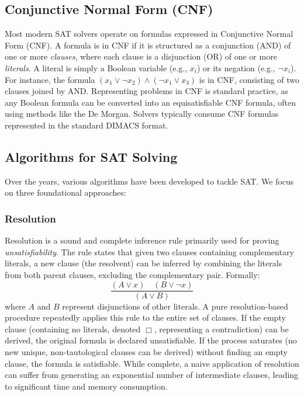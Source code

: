 \documentclass[12pt, a4paper]{article}
\begin{document}
\subsection{Conjunctive Normal Form (CNF)}
\label{subsec:cnf}

Most modern SAT solvers operate on formulas expressed in Conjunctive Normal Form (CNF). A formula is in CNF if it is structured as a conjunction (AND) of one or more \emph{clauses}, where each clause is a disjunction (OR) of one or more \emph{literals}. A literal is simply a Boolean variable (e.g., $x_i$) or its negation (e.g., $\lnot x_i$). For instance, the formula $(x_1 \lor \lnot x_2) \land (\lnot x_1 \lor x_3)$ is in CNF, consisting of two clauses joined by AND. Representing problems in CNF is standard practice, as any Boolean formula can be converted into an equisatisfiable CNF formula, often using methods like the De Morgan. Solvers typically consume CNF formulas represented in the standard DIMACS format.

\subsection{Algorithms for SAT Solving}
\label{subsec:algorithms}

Over the years, various algorithms have been developed to tackle SAT. We focus on three foundational approaches:

\subsubsection{Resolution}
\label{subsubsec:resolution}

Resolution is a sound and complete inference rule primarily used for proving \emph{unsatisfiability}. The rule states that given two clauses containing complementary literals, a new clause (the resolvent) can be inferred by combining the literals from both parent clauses, excluding the complementary pair. Formally:
\[
\frac{(A \lor x) \quad (B \lor \lnot x)}{(A \lor B)}
\]
where $A$ and $B$ represent disjunctions of other literals. A pure resolution-based procedure repeatedly applies this rule to the entire set of clauses. If the empty clause (containing no literals, denoted $\Box$, representing a contradiction) can be derived, the original formula is declared unsatisfiable. If the process saturates (no new unique, non-tautological clauses can be derived) without finding an empty clause, the formula is satisfiable. While complete, a naive application of resolution can suffer from generating an exponential number of intermediate clauses, leading to significant time and memory consumption.
\end{document}
